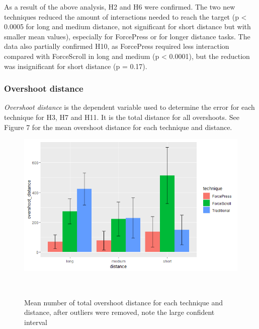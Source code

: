 \documentclass{sigchi}
\begin{document}
As a result of the above analysis, H2 and H6 were confirmed. The two new techniques reduced the amount of interactions needed to reach the target (p < 0.0005 for long and medium distance, not significant for short distance but with smaller mean values), especially for ForcePress or for longer distance tasks. The data also partially confirmed H10, as ForcePress required less interaction compared with ForceScroll in long and medium (p < 0.0001), but the reduction was insignificant for short distance (p = 0.17).

\subsubsection{Overshoot distance}  
\textit{Overshoot distance} is the dependent variable used to determine the error for each technique for H3, H7 and H11. It is the total distance for all overshoots. See Figure 7 for the mean overshoot distance for each technique and distance.

\begin{figure}[!h]
	\centering
	\includegraphics[width=0.8\columnwidth]{figures/figure6}
	\caption{Mean number of total overshoot distance for each technique and distance, after outliers were removed, note the large confident interval}~\label{fig:figure7}
\end{figure}
\end{document}
